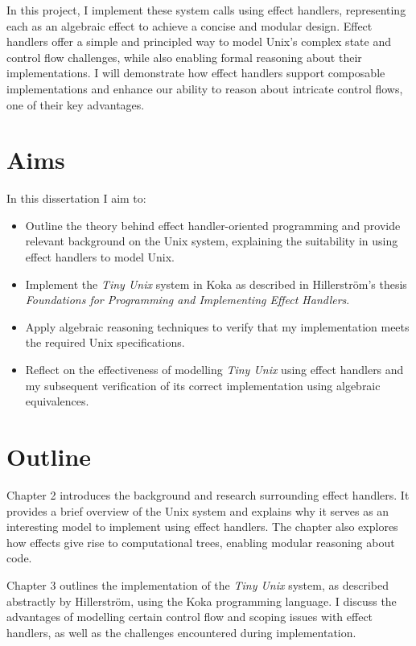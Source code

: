 \documentclass[logo,bsc,singlespacing,parskip]{infthesis}
\begin{document}
In this project, I implement these system calls using effect handlers, representing each as an algebraic effect to achieve a concise and modular design. Effect handlers offer a simple and principled way to model Unix’s complex state and control flow challenges, while also enabling formal reasoning about their implementations. I will demonstrate how effect handlers support composable implementations and enhance our ability to reason about intricate control flows, one of their key advantages.

\section{Aims}
In this dissertation I aim to:
\begin{itemize}
    \item Outline the theory behind effect handler-oriented programming and provide relevant background on the Unix system, explaining the suitability in using effect handlers to model Unix.
    \item Implement the \textit{Tiny Unix} system in Koka as described in Hillerström's thesis \textit{Foundations for Programming and Implementing Effect Handlers}\cite{hillerstrom_foundations_nodate}.
    \item Apply algebraic reasoning techniques to verify that my implementation meets the required Unix specifications. 
    \item Reflect on the effectiveness of modelling \textit{Tiny Unix} using  effect handlers and my subsequent verification of its correct implementation using algebraic equivalences.
    
\end{itemize}

\section{Outline}

Chapter 2 introduces the background and research surrounding effect handlers. It provides a brief overview of the Unix system and explains why it serves as an interesting model to implement using effect handlers. The chapter also explores how effects give rise to computational trees, enabling modular reasoning about code.

Chapter 3 outlines the implementation of the \textit{Tiny Unix} system, as described abstractly by Hillerström, using the Koka programming language. I discuss the advantages of modelling certain control flow and scoping issues with effect handlers, as well as the challenges encountered during implementation.
\end{document}
